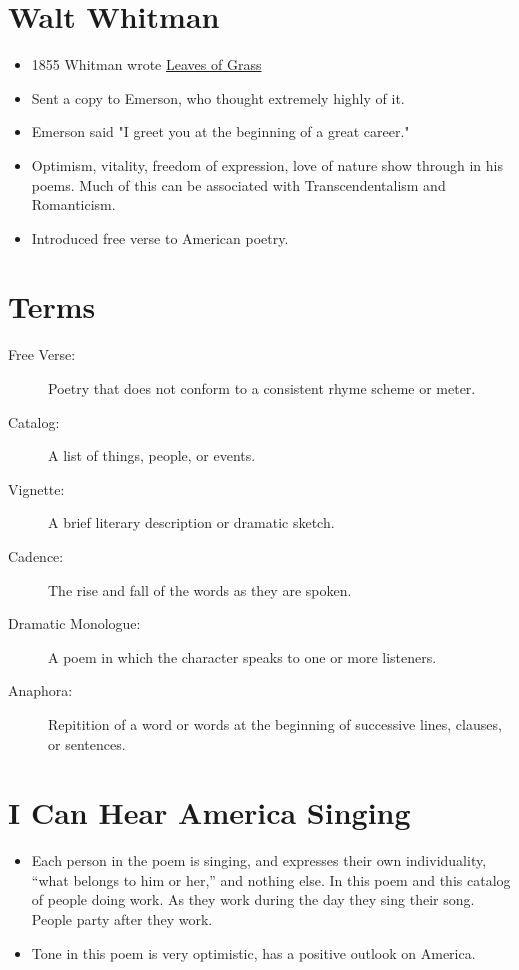 \documentclass[10pt]{article}
\begin{document}
\section{Walt Whitman}
\begin{itemize}
	\item 1855 Whitman wrote \underline{Leaves of Grass}
	\item Sent a copy to Emerson, who thought extremely highly of it.
	\item Emerson said "I greet you at the beginning of a great career."
	\item Optimism, vitality, freedom of expression, love of nature show 
		through in his poems.  Much of this can be associated with 
		Transcendentalism and Romanticism.
	\item Introduced free verse to American poetry.
\end{itemize}
\section{Terms}
\begin{description}
	\item[Free Verse:] Poetry that does not conform to a consistent rhyme scheme or meter.
	\item[Catalog:] A list of things, people, or events.
	\item[Vignette:] A brief literary description or dramatic sketch.
	\item[Cadence:] The rise and fall of the words as they are spoken.
	\item[Dramatic Monologue:] A poem in which the character speaks to one or more listeners.
	\item[Anaphora:] Repitition of a word or words at the beginning of successive lines, clauses, or sentences.
\end{description}
\section{I Can Hear America Singing}
\begin{itemize}
	\item Each person in the poem is singing, and expresses their own 
		individuality, ``what belongs to him or her,'' and nothing 
		else.  In this poem and this catalog of people doing work.  As 
		they work during the day they sing their song.  People party 
		after they work.  
	\item Tone in this poem is very optimistic, has a positive outlook on 
		America.  
\end{itemize}
\end{document}
